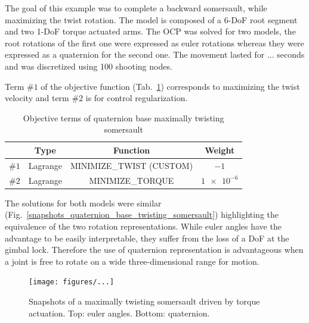 The goal of this example was to complete a backward somersault, while maximizing the twist rotation.
The model is composed of a 6-DoF root segment and two 1-DoF torque actuated arms.
The OCP was solved for two models, the root rotations of the first one were expressed as euler rotations whereas they were expressed as a quaternion for the second one.
The movement lasted for ... seconds and was discretized using 100 shooting nodes.

Term $\#1$ of the objective function (Tab.~\ref{tab:Quaternion_base_twisting_somersault}) corresponds to maximizing the twist velocity and term $\#2$ is for control regularization.


\begin{table}[h!]
\caption{\small Objective terms of quaternion base maximally twisting somersault}
\label{tab:Quaternion_base_twisting_somersault}
\centering
\begin{tabular}{c c c c}
\toprule 
& Type & Function & Weight \\ 
\midrule
$\#1$ & Lagrange & MINIMIZE\_TWIST (CUSTOM) & $-1$ \\ 
\midrule
$\#2$ & Lagrange & MINIMIZE\_TORQUE & $\num{1e-6}$ \\ 
\bottomrule
\end{tabular}
\end{table}

The solutions for both models were similar (Fig.~\ref{snapshots_quaternion_base_twisting_somersault}) highlighting the equivalence of the two rotation representations.
While euler angles have the advantage to be easily interpretable, they suffer from the loss of a DoF at the gimbal lock.
Therefore the use of quaternion representation is advantageous when a joint is free to rotate on a wide three-dimensional range for motion.


\begin{figure}[t!]
\centering
\texttt{[image: figures/...]}\\
\caption{Snapshots of a maximally twisting somersault driven by torque actuation. Top: euler angles. Bottom: quaternion.}
\label{fig:snapshots_quaternion_base_twisting_somersault}
\end{figure}












